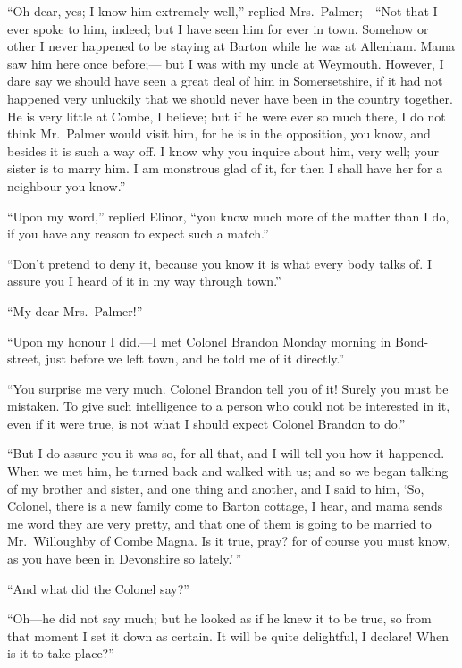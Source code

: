 ``Oh dear, yes; I know him extremely well,''
replied Mrs.\ Palmer;---``Not that I ever spoke
to him, indeed; but I have seen him for ever in town.
Somehow or other I never happened to be staying at Barton
while he was at Allenham.  Mama saw him here once before;---%
but I was with my uncle at Weymouth.  However, I dare say
we should have seen a great deal of him in Somersetshire,
if it had not happened very unluckily that we should never
have been in the country together.  He is very little
at Combe, I believe; but if he were ever so much there,
I do not think Mr.\ Palmer would visit him, for he is
in the opposition, you know, and besides it is such a
way off.  I know why you inquire about him, very well;
your sister is to marry him.  I am monstrous glad of it,
for then I shall have her for a neighbour you know.''

``Upon my word,'' replied Elinor, ``you know much
more of the matter than I do, if you have any reason
to expect such a match.''

``Don't pretend to deny it, because you know it is
what every body talks of.  I assure you I heard of it
in my way through town.''

``My dear Mrs.\ Palmer!''

``Upon my honour I did.---I met Colonel Brandon
Monday morning in Bond-street, just before we left town,
and he told me of it directly.''

``You surprise me very much.  Colonel Brandon tell
you of it!  Surely you must be mistaken.  To give such
intelligence to a person who could not be interested in it,
even if it were true, is not what I should expect Colonel
Brandon to do.''

``But I do assure you it was so, for all that,
and I will tell you how it happened.  When we met him,
he turned back and walked with us; and so we began talking
of my brother and sister, and one thing and another,
and I said to him, `So, Colonel, there is a new family
come to Barton cottage, I hear, and mama sends me word
they are very pretty, and that one of them is going to be
married to Mr.\ Willoughby of Combe Magna.  Is it true,
pray? for of course you must know, as you have been in
Devonshire so lately.'\,''

``And what did the Colonel say?''

``Oh---he did not say much; but he looked as if he
knew it to be true, so from that moment I set it down
as certain.  It will be quite delightful, I declare!
When is it to take place?''

